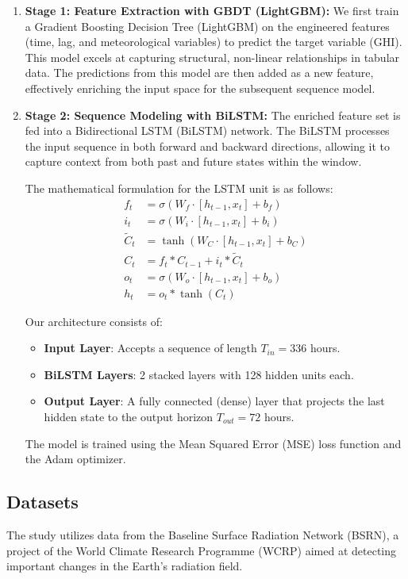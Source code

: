 \documentclass{article}
\begin{document}
\begin{enumerate}
    \item \textbf{Stage 1: Feature Extraction with GBDT (LightGBM):} 
    We first train a Gradient Boosting Decision Tree (LightGBM) on the engineered features (time, lag, and meteorological variables) to predict the target variable (GHI). This model excels at capturing structural, non-linear relationships in tabular data. The predictions from this model are then added as a new feature, effectively enriching the input space for the subsequent sequence model.
    
    \item \textbf{Stage 2: Sequence Modeling with BiLSTM:}
    The enriched feature set is fed into a Bidirectional LSTM (BiLSTM) network. The BiLSTM processes the input sequence in both forward and backward directions, allowing it to capture context from both past and future states within the window.
    
    The mathematical formulation for the LSTM unit is as follows:
    \begin{align*}
        f_t &= \sigma(W_f \cdot [h_{t-1}, x_t] + b_f) \\
        i_t &= \sigma(W_i \cdot [h_{t-1}, x_t] + b_i) \\
        \tilde{C}_t &= \tanh(W_C \cdot [h_{t-1}, x_t] + b_C) \\
        C_t &= f_t * C_{t-1} + i_t * \tilde{C}_t \\
        o_t &= \sigma(W_o \cdot [h_{t-1}, x_t] + b_o) \\
        h_t &= o_t * \tanh(C_t)
    \end{align*}
    
    Our architecture consists of:
    \begin{itemize}
        \item \textbf{Input Layer}: Accepts a sequence of length $T_{in} = 336$ hours.
        \item \textbf{BiLSTM Layers}: 2 stacked layers with 128 hidden units each.
        \item \textbf{Output Layer}: A fully connected (dense) layer that projects the last hidden state to the output horizon $T_{out} = 72$ hours.
    \end{itemize}
    
    The model is trained using the Mean Squared Error (MSE) loss function and the Adam optimizer.
\end{enumerate}

\subsection{Datasets}
The study utilizes data from the Baseline Surface Radiation Network (BSRN), a project of the World Climate Research Programme (WCRP) aimed at detecting important changes in the Earth's radiation field.
\end{document}
